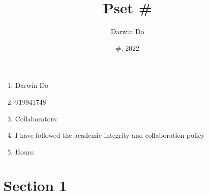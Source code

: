 \documentclass{article}
\title{Pset \#}
\begin{document}
\newcommand{\Not}{\textbf{not}}
\newcommand{\AAnd}{\textbf{and}}
\newcommand{\True}{\texttt{True}}
\newcommand{\False}{\texttt{False}}

\date{\#, 2022 }
\author{Darwin Do}

\maketitle

\begin{enumerate}
    \item Darwin Do
    \item 919941748
    \item Collaborators: 
    \item I have followed the academic integrity and collaboration policy
    \item Hours: 
\end{enumerate}

\newpage

\section{Section 1}
\end{document}
